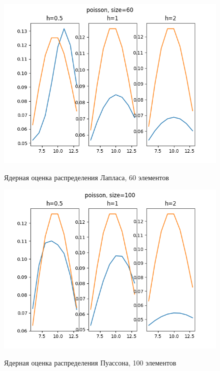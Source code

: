 \documentclass[12pt,a4paper]{article}
\begin{document}
			\begin{figure}[htp]
				{\includegraphics[width=1\linewidth]{../plots/poisson_60.png}}
				\caption{Ядерная оценка распределения Лапласа, 60 элементов}
			\end{figure}
			\begin{figure}
				{\includegraphics[width=1\linewidth]{../plots/poisson_100.png}}
				\caption{Ядерная оценка распределения Пуассона, 100 элементов}
			\end{figure}
			
\end{document}
